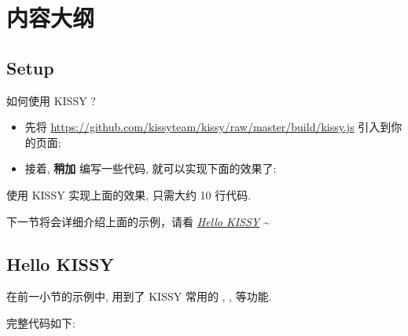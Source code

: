 \documentclass[letterpaper,10pt,english]{sphinxmanual}
\begin{document}
\section{内容大纲}
\label{quickstart/index:id3}

\subsection{Setup}
\label{quickstart/setup:setup}\label{quickstart/setup::doc}\label{quickstart/setup:id1}
如何使用 KISSY ?
\begin{itemize}
\item {}
先将 \href{https://github.com/kissyteam/kissy/raw/master/build/kissy.js}{https://github.com/kissyteam/kissy/raw/master/build/kissy.js} 引入到你的页面;

\item {}
接着, \textbf{稍加} 编写一些代码, 就可以实现下面的效果了:

\end{itemize}

使用 KISSY 实现上面的效果, 只需大约 10 行代码.

下一节将会详细介绍上面的示例，请看 {\hyperref[quickstart/hellokissy:hellokissy]{\emph{Hello KISSY}}} \textasciitilde{}


\subsection{Hello KISSY}
\label{quickstart/hellokissy::doc}\label{quickstart/hellokissy:hellokissy}\label{quickstart/hellokissy:hello-kissy}
在前一小节的示例中, 用到了 KISSY 常用的 , ,  等功能.

完整代码如下:
\end{document}
